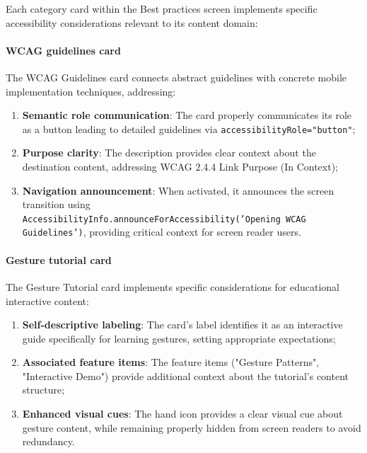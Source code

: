 Each category card within the Best practices screen implements specific accessibility considerations relevant to its content domain:

\paragraph{WCAG guidelines card}

The WCAG Guidelines card connects abstract guidelines with concrete mobile implementation techniques, addressing:

\begin{enumerate}
    \item \textbf{Semantic role communication}: The card properly communicates its role as a button leading to detailed guidelines via \texttt{accessibilityRole="button"};
    
    \item \textbf{Purpose clarity}: The description provides clear context about the destination content, addressing WCAG 2.4.4 Link Purpose (In Context);
    
    \item \textbf{Navigation announcement}: When activated, it announces the screen transition using \\ \texttt{AccessibilityInfo.announceForAccessibility('Opening WCAG Guidelines')}, providing critical context for screen reader users.
\end{enumerate}

\paragraph{Gesture tutorial card}

The Gesture Tutorial card implements specific considerations for educational interactive content:

\begin{enumerate}
    \item \textbf{Self-descriptive labeling}: The card's label identifies it as an interactive guide specifically for learning gestures, setting appropriate expectations;
    
    \item \textbf{Associated feature items}: The feature items ("Gesture Patterns", "Interactive Demo") provide additional context about the tutorial's content structure;
    
    \item \textbf{Enhanced visual cues}: The hand icon provides a clear visual cue about gesture content, while remaining properly hidden from screen readers to avoid redundancy.
\end{enumerate}

